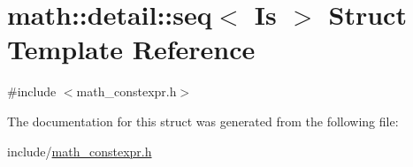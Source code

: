 \hypertarget{structmath_1_1detail_1_1seq}{}\section{math\+:\+:detail\+:\+:seq$<$ Is $>$ Struct Template Reference}
\label{structmath_1_1detail_1_1seq}


{\ttfamily \#include $<$math\+\_\+constexpr.\+h$>$}



The documentation for this struct was generated from the following file\+:\begin{DoxyCompactItemize}
\item 
include/\hyperlink{math__constexpr_8h}{math\+\_\+constexpr.\+h}\end{DoxyCompactItemize}
